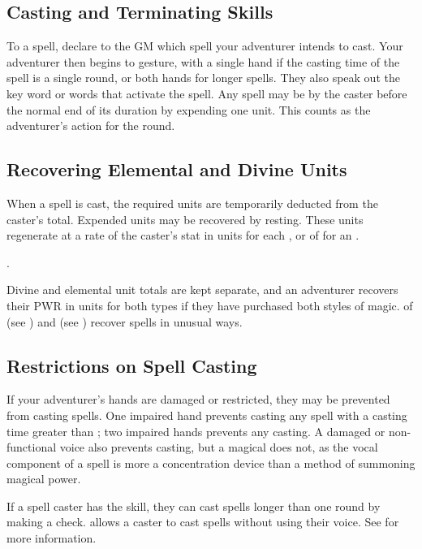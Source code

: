 \begin{multicols}{2}
\subsection{Casting and Terminating Skills}
To  a spell, declare to the GM which spell your adventurer intends to cast. Your adventurer then begins to gesture, with a single hand if the casting time of the spell is a single round, or both hands for longer spells. They also speak out the key word or words that activate the spell. Any spell may be  by the caster before
the normal end of its duration by expending one unit. This counts as the adventurer's action for the round.
\subsection{Recovering Elemental and Divine Units}
When a spell is cast, the required units are temporarily deducted from the caster's total. Expended units may be recovered by resting. These units regenerate at a rate of the caster's \PWR stat in units for each  , or  of  for an .

. 

Divine and elemental unit totals are kept separate, and an adventurer recovers their PWR in units for both types if they have purchased both styles of magic.  of  (see ) and  (see ) recover spells in unusual ways.
\subsection{Restrictions on Spell Casting}
If your adventurer's hands are damaged or restricted, they may be prevented from casting spells. One impaired hand prevents casting any spell with a casting time greater than ; two impaired hands prevents any casting. A damaged or non-functional voice also prevents casting, but a magical  does not, as the vocal component of a spell is more a concentration device than a method of summoning magical power. 

If a spell caster has the  skill, they can cast spells longer than one round by making a check.  allows a caster to cast spells without using their voice. See  for more information.


\end{multicols}
